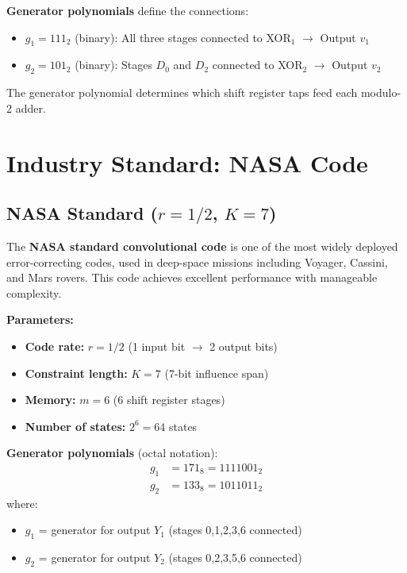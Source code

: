 \textbf{Generator polynomials} define the connections:
\begin{itemize}
\item $g_1 = 111_2$ (binary): All three stages connected to XOR$_1$ $\rightarrow$ Output $v_1$
\item $g_2 = 101_2$ (binary): Stages $D_0$ and $D_2$ connected to XOR$_2$ $\rightarrow$ Output $v_2$
\end{itemize}

The generator polynomial determines which shift register taps feed each modulo-2 adder.

\section{Industry Standard: NASA Code}

\subsection{NASA Standard ($r=1/2$, $K=7$)}

The \textbf{NASA standard convolutional code} is one of the most widely deployed error-correcting codes, used in deep-space missions including Voyager, Cassini, and Mars rovers. This code achieves excellent performance with manageable complexity.

\textbf{Parameters:}
\begin{itemize}
\item \textbf{Code rate:} $r = 1/2$ (1 input bit $\rightarrow$ 2 output bits)
\item \textbf{Constraint length:} $K = 7$ (7-bit influence span)
\item \textbf{Memory:} $m = 6$ (6 shift register stages)
\item \textbf{Number of states:} $2^6 = 64$ states
\end{itemize}

\textbf{Generator polynomials} (octal notation):
\begin{align}
g_1 &= 171_8 = 1111001_2 \label{eq:nasa-g1} \\
g_2 &= 133_8 = 1011011_2 \label{eq:nasa-g2}
\end{align}
where:
\begin{itemize}
\item $g_1$ = generator for output $Y_1$ (stages 0,1,2,3,6 connected)
\item $g_2$ = generator for output $Y_2$ (stages 0,2,3,5,6 connected)
\end{itemize}

